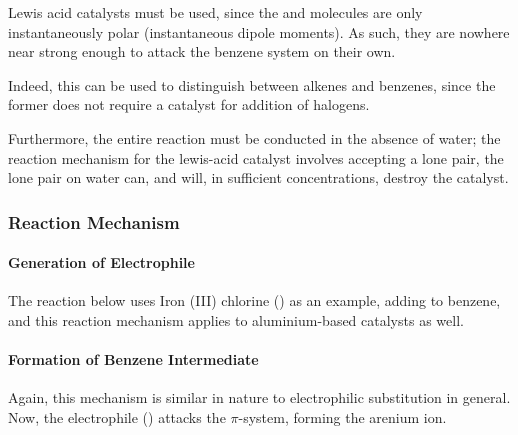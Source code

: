 				Lewis acid catalysts must be used, since the  and \ch{\Cl-\Cl} molecules are only instantaneously
				polar (instantaneous dipole moments). As such, they are nowhere near strong enough to attack the benzene system on their own.

				Indeed, this can be used to distinguish between alkenes and benzenes, since the former does not require a catalyst for addition
				of halogens.

				Furthermore, the entire reaction must be conducted in the absence of water; the reaction mechanism for the lewis-acid catalyst
				involves accepting a lone pair, the lone pair on water can, and will, in sufficient concentrations, destroy the catalyst.




			\subsubsection{Reaction Mechanism}

				\paragraph{Generation of Electrophile}

				The reaction below uses Iron (III) chlorine () as an example, adding \ch{\Cl} to benzene,
				and this reaction mechanism applies to aluminium-based catalysts as well.



				\pagebreak

				\paragraph{Formation of Benzene Intermediate}

				Again, this mechanism is similar in nature to electrophilic substitution in general. Now, the electrophile () attacks
				the $\pi$-system, forming the arenium ion.



